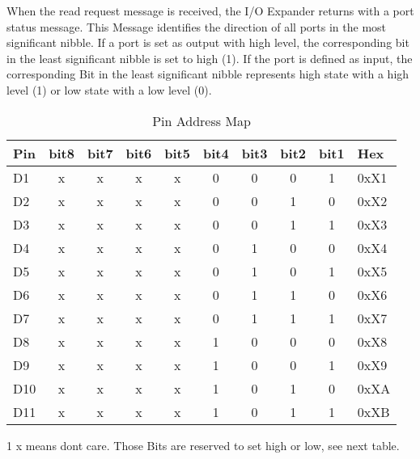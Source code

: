 \documentclass[10pt]{datasheet}
\begin{document}
When the read request message is received, the I/O Expander returns with a port 
status message. This Message identifies the direction of all ports in the most 
significant nibble. If a port is set as output with high level, the 
corresponding bit in the least significant nibble is set to high (1). If the 
port is defined as input, the corresponding Bit in the least significant nibble 
represents high state with a high level (1) or low state with a low level (0).


\onecolumn

\begin{table}[h]
\begin{threeparttable}
\caption{Pin Address Map}
\label{table:Pin_address_map}
\begin{tabularx}{\textwidth}{l | c | c | c | c | c | c | c | c | X}
    \thickhline
    \textbf{Pin}	& \textbf{bit8}	& \textbf{bit7}	& \textbf{bit6}	& \textbf{bit5}	& \textbf{bit4}	& \textbf{bit3}	& \textbf{bit2}	& \textbf{bit1} 	& \textbf{Hex} \\
    \hline
    D1	&	x	&	x	&	x	&	x	&	0	&	0	&	0	&	1 	& 0xX1 \\
    \hline
    D2	&	x	&	x	&	x	&	x	&	0	&	0	&	1	&	0	& 0xX2 \\
    \hline
    D3	&	x	&	x	&	x	&	x	&	0	&	0	&	1	&	1	& 0xX3 \\
    \hline
    D4	&	x	&	x	&	x	&	x	&	0	&	1	&	0	&	0	& 0xX4 \\
    \hline
    D5	&	x	&	x	&	x	&	x	&	0	&	1	&	0	&	1	& 0xX5 \\
    \hline
    D6	&	x	&	x	&	x	&	x	&	0	&	1	&	1	&	0	& 0xX6 \\
    \hline
    D7	&	x	&	x	&	x	&	x	&	0	&	1	&	1	&	1	& 0xX7 \\
    \hline
    D8	&	x	&	x	&	x	&	x	&	1	&	0	&	0	&	0	& 0xX8 \\
    \hline
    D9	&	x	&	x	&	x	&	x	&	1	&	0	&	0	&	1	& 0xX9 \\
    \hline
    D10	&	x	&	x	&	x	&	x	&	1	&	0	&	1	&	0	& 0xXA \\
    \hline
    D11	&	x	&	x	&	x	&	x	&	1	&	0	&	1	&	1	& 0xXB \\
\end{tabularx}
\begin{tablenotes}
\item[1]{x means dont care. Those Bits are reserved to set high or low, see next table.}
\end{tablenotes}
\end{threeparttable}
\end{table}
\end{document}
